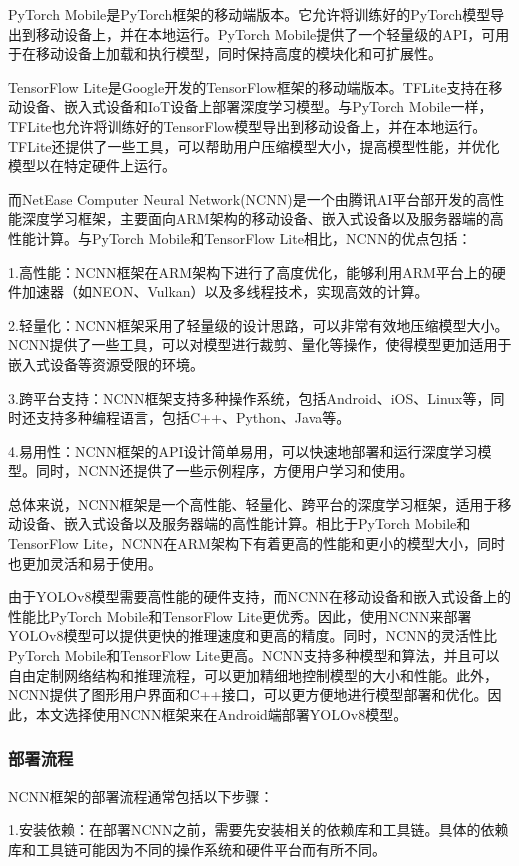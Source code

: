 \documentclass{ctexart}
\numberwithin{equation}{section}%
\numberwithin{figure}{section}%
\numberwithin{table}{section}%
\begin{document}
	PyTorch Mobile是PyTorch框架的移动端版本。它允许将训练好的PyTorch模型导出到移动设备上，并在本地运行。PyTorch Mobile提供了一个轻量级的API，可用于在移动设备上加载和执行模型，同时保持高度的模块化和可扩展性。
	
	TensorFlow Lite是Google开发的TensorFlow框架的移动端版本。TFLite支持在移动设备、嵌入式设备和IoT设备上部署深度学习模型。与PyTorch Mobile一样，TFLite也允许将训练好的TensorFlow模型导出到移动设备上，并在本地运行。TFLite还提供了一些工具，可以帮助用户压缩模型大小，提高模型性能，并优化模型以在特定硬件上运行。
	
	而NetEase Computer Neural Network(NCNN)是一个由腾讯AI平台部开发的高性能深度学习框架，主要面向ARM架构的移动设备、嵌入式设备以及服务器端的高性能计算。与PyTorch Mobile和TensorFlow Lite相比，NCNN的优点包括：
	
	1.高性能：NCNN框架在ARM架构下进行了高度优化，能够利用ARM平台上的硬件加速器（如NEON、Vulkan）以及多线程技术，实现高效的计算。
	
	2.轻量化：NCNN框架采用了轻量级的设计思路，可以非常有效地压缩模型大小。NCNN提供了一些工具，可以对模型进行裁剪、量化等操作，使得模型更加适用于嵌入式设备等资源受限的环境。
	
	3.跨平台支持：NCNN框架支持多种操作系统，包括Android、iOS、Linux等，同时还支持多种编程语言，包括C++、Python、Java等。
	
	4.易用性：NCNN框架的API设计简单易用，可以快速地部署和运行深度学习模型。同时，NCNN还提供了一些示例程序，方便用户学习和使用。
	
	总体来说，NCNN框架是一个高性能、轻量化、跨平台的深度学习框架，适用于移动设备、嵌入式设备以及服务器端的高性能计算。相比于PyTorch Mobile和TensorFlow Lite，NCNN在ARM架构下有着更高的性能和更小的模型大小，同时也更加灵活和易于使用。
	
	由于YOLOv8模型需要高性能的硬件支持，而NCNN在移动设备和嵌入式设备上的性能比PyTorch Mobile和TensorFlow Lite更优秀。因此，使用NCNN来部署YOLOv8模型可以提供更快的推理速度和更高的精度。同时，NCNN的灵活性比PyTorch Mobile和TensorFlow Lite更高。NCNN支持多种模型和算法，并且可以自由定制网络结构和推理流程，可以更加精细地控制模型的大小和性能。此外，NCNN提供了图形用户界面和C++接口，可以更方便地进行模型部署和优化。因此，本文选择使用NCNN框架来在Android端部署YOLOv8模型。
	
	\subsubsection{部署流程}
	NCNN框架的部署流程通常包括以下步骤：
	
	1.安装依赖：在部署NCNN之前，需要先安装相关的依赖库和工具链。具体的依赖库和工具链可能因为不同的操作系统和硬件平台而有所不同。
	
\end{document}
